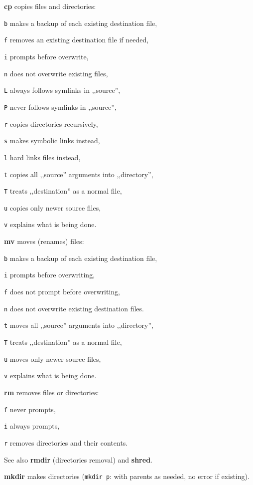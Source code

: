 \begin{enumx}
	\item [\cmdblack] \textbf{cp} copies files and directories:
	\item [\texttt{b}] makes a backup of each existing destination file,
	\item [\texttt{f}] removes an existing destination file if needed,
	\item [\texttt{i}] prompts before overwrite,
	\item [\texttt{n}] does not overwrite existing files,
	\item [\texttt{L}] always follows symlinks in ,,source'',
	\item [\texttt{P}] never follows symlinks in ,,source'',
	\item [\texttt{r}] copies directories recursively,
	\item [\texttt{s}] makes symbolic links instead,
	\item [\texttt{l}] hard links files instead,
	\item [\texttt{t}] copies all ,,source'' arguments into ,,directory'',
	\item [\texttt{T}] treats ,,destination'' as a normal file,
	\item [\texttt{u}] copies only newer source files,
	\item [\texttt{v}] explains what is being done.
	
	\item [\cmdblack] \textbf{mv} moves (renames) files:
	\item [\texttt{b}] makes a backup of each existing destination file,
	\item [\texttt{i}] prompts before overwriting,
	\item [\texttt{f}] does not prompt before overwriting,
	\item [\texttt{n}] does not overwrite existing destination files.
	\item [\texttt{t}] moves all ,,source'' arguments into ,,directory'',
	\item [\texttt{T}] treats ,,destination'' as a normal file,
	\item [\texttt{u}] moves only newer source files,
	\item [\texttt{v}] explains what is being done.
	
	\item [\cmdblack] \textbf{rm} removes files or directories:
	\item [\texttt{f}] never prompts,
	\item [\texttt{i}] always prompts,
	\item [\texttt{r}] removes directories and their contents.

	\item [\cmdblack] See also \textbf{rmdir} (directories removal) and \textbf{shred}.

	\item [\cmdblack] \textbf{mkdir} makes directories 
	(\texttt{mkdir p}: with parents as needed, no error if existing).
\end{enumx}

